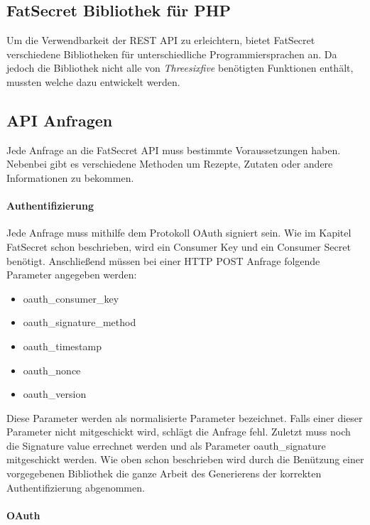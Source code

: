 \subsection{FatSecret Bibliothek für PHP}

Um die Verwendbarkeit der REST API zu erleichtern, bietet FatSecret verschiedene Bibliotheken\cite{FatSecretLib} für unterschiedliche Programmiersprachen an. Da jedoch die Bibliothek nicht alle von \textit{Threesixfive} benötigten Funktionen enthält, mussten welche dazu entwickelt werden.

\subsection{API Anfragen}

Jede Anfrage\cite{FatSecretRESTAPI} an die FatSecret API muss bestimmte Voraussetzungen haben. Nebenbei gibt es verschiedene Methoden um Rezepte, Zutaten oder andere Informationen zu bekommen. 

\paragraph{Authentifizierung}

Jede Anfrage\cite{FatSecretAuth} muss mithilfe dem Protokoll OAuth signiert sein. Wie im Kapitel FatSecret schon beschrieben, wird ein Consumer Key und ein Consumer Secret benötigt. Anschließend müssen bei einer HTTP POST Anfrage folgende Parameter angegeben werden:

\begin{itemize}
\item{oauth\_consumer\_key}
\item{oauth\_signature\_method}
\item{oauth\_timestamp}
\item{oauth\_nonce}
\item{oauth\_version}
\end{itemize}

Diese Parameter werden als normalisierte Parameter bezeichnet. Falls einer dieser Parameter nicht mitgeschickt wird, schlägt die Anfrage fehl. Zuletzt muss noch die Signature value errechnet werden und als Parameter oauth\_signature mitgeschickt werden. Wie oben schon beschrieben wird durch die Benützung einer vorgegebenen Bibliothek die ganze Arbeit des Generierens der korrekten Authentifizierung abgenommen. 

\paragraph{OAuth}


